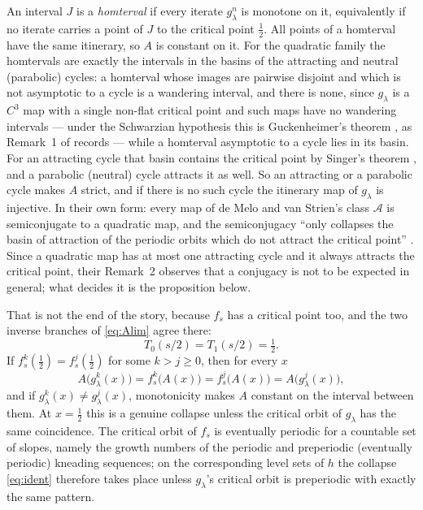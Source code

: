 \documentclass[11pt]{article}
\theoremstyle{plain}
\theoremstyle{definition}
\begin{document}
An interval $J$ is a \emph{homterval} \cite{dMvS} if every iterate $g_\lambda^n$ is monotone on it,
equivalently if no iterate carries a point of $J$ to the critical point $\tfrac12$.  All points
of a homterval have the same itinerary, so $A$ is constant on it.  For the quadratic family the
homtervals are exactly the intervals in the basins of the attracting and neutral (parabolic)
cycles: a homterval whose images are pairwise disjoint and which is not asymptotic to a cycle
is a wandering interval, and there is none, since $g_\lambda$ is a $C^3$ map with a single
non-flat critical point and such maps have no wandering intervals \cite{dMvdS88} --- under the
Schwarzian hypothesis this is Guckenheimer's theorem \cite{Guck}, as Remark~1 of
\cite{dMvdS88} records --- while a homterval asymptotic to a cycle lies in its basin.  For an attracting cycle that basin contains
the critical point by Singer's theorem \cite{Sing}, and a parabolic (neutral) cycle attracts it
as well.  So an attracting or a parabolic cycle makes $A$ strict, and if there is no such cycle
the itinerary map of $g_\lambda$ is injective.  In their own form: every map of de Melo and van
Strien's class $\mathcal A$ is semiconjugate to a quadratic map, and the semiconjugacy ``only
collapses the basin of attraction of the periodic orbits which do not attract the critical
point'' \cite{dMvdS88}.  Since a quadratic map has at most one attracting cycle and it always
attracts the critical point, their Remark~2 observes that a conjugacy is not to be expected in
general; what decides it is the proposition below.

That is not the end of the story, because $f_s$ has a critical point too, and the two inverse
branches of \eqref{eq:Alim} agree there:
\[
  T_0(s/2)=T_1(s/2)=\tfrac12 .
\]
If $f_s^k(\tfrac12)=f_s^j(\tfrac12)$ for some $k>j\ge0$, then for every $x$
\begin{equation}\label{eq:ident}
  A\bigl(g_\lambda^k(x)\bigr)=f_s^k\bigl(A(x)\bigr)
  =f_s^j\bigl(A(x)\bigr)=A\bigl(g_\lambda^j(x)\bigr),
\end{equation}
and if $g_\lambda^k(x)\ne g_\lambda^j(x)$, monotonicity makes $A$ constant on the interval
between them.  At $x=\tfrac12$ this is a genuine collapse unless the critical orbit of
$g_\lambda$ has the same coincidence.  The critical orbit of $f_s$ is eventually periodic for a
countable set of slopes, namely the growth numbers of the periodic and preperiodic
(eventually periodic) kneading
sequences; on the corresponding level sets of $h$ the collapse \eqref{eq:ident} therefore takes
place unless $g_\lambda$'s critical orbit is preperiodic with exactly the same pattern.
\end{document}
